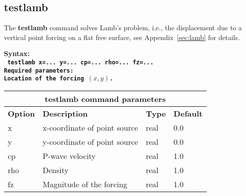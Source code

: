 \documentclass[11pt]{report}
\begin{document}
\subsection{testlamb}
\label{keyword:testlamb}
The {\bf testlamb} command solves Lamb's problem, i.e., the displacement due to a vertical point
forcing on a flat free surface, see Appendix~\ref{sec:lamb} for details. 
\begin{flushleft}
\bf
Syntax:\\
\tt
testlamb x=... y=... cp=... rho=... fz=...
\\
\bf Required parameters:\\
\rm Location of the forcing $(x, y)$.
\end{flushleft}
%
\begin{center}
\begin{tabular}{|l|p{8cm}|l|l|} \hline
\multicolumn{4}{|c|}{\bf testlamb command  parameters}\\ \hline
\bf{Option} & \bf{Description} & \bf{Type} & \bf{Default} \\ \hline \hline
x    & x-coordinate of point source & real & 0.0 \\ \hline
y    & y-coordinate of point source & real & 0.0 \\ \hline
cp   & P-wave velocity              & real & 1.0 \\ \hline
rho  & Density                      & real & 1.0 \\ \hline
fz   & Magnitude of the forcing     & real & 1.0 \\ \hline
\end{tabular}
\end{center}

\end{document}
